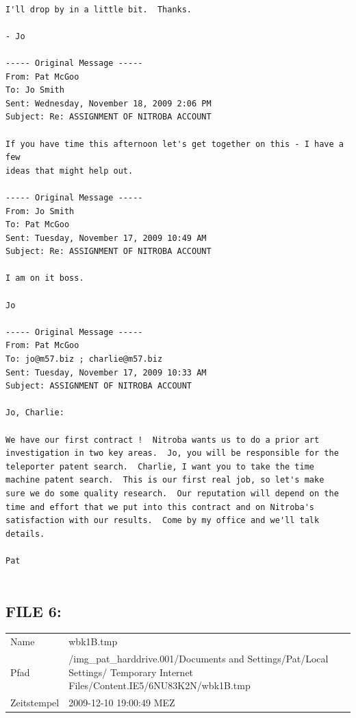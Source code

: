\begin{lstlisting}

I'll drop by in a little bit.  Thanks.

- Jo

----- Original Message -----
From: Pat McGoo
To: Jo Smith
Sent: Wednesday, November 18, 2009 2:06 PM
Subject: Re: ASSIGNMENT OF NITROBA ACCOUNT

If you have time this afternoon let's get together on this - I have a few
ideas that might help out.

----- Original Message -----
From: Jo Smith
To: Pat McGoo
Sent: Tuesday, November 17, 2009 10:49 AM
Subject: Re: ASSIGNMENT OF NITROBA ACCOUNT

I am on it boss.

Jo

----- Original Message -----
From: Pat McGoo
To: jo@m57.biz ; charlie@m57.biz
Sent: Tuesday, November 17, 2009 10:33 AM
Subject: ASSIGNMENT OF NITROBA ACCOUNT

Jo, Charlie:

We have our first contract !  Nitroba wants us to do a prior art
investigation in two key areas.  Jo, you will be responsible for the
teleporter patent search.  Charlie, I want you to take the time
machine patent search.  This is our first real job, so let's make
sure we do some quality research.  Our reputation will depend on the
time and effort that we put into this contract and on Nitroba's
satisfaction with our results.  Come by my office and we'll talk
details.

Pat


\end{lstlisting}

\subsection{FILE 6:}
\label{sec:pat_emails_6}	

\begin{table}[htb]
	\begin{tabular}{p{2cm} p{13.5cm}}
		Name & wbk1B.tmp\\
		Pfad & /img_pat_harddrive.001/Documents and Settings/Pat/Local Settings/ Temporary Internet Files/Content.IE5/6NU83K2N/wbk1B.tmp\\
		Zeitstempel & 2009-12-10 19:00:49 MEZ
	\end{tabular}
\end{table}	

